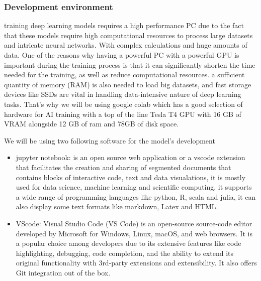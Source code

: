 \subsubsection{Development environment}
training deep learning models requires a high performance PC due to the fact that these models require high computational resources to process large datasets and intricate neural networks.  With complex calculations and huge amounts of data. One of the reasons why having a powerful PC with a powerful GPU is important during the training process is that it can significantly shorten the time needed for the training, as well as reduce computational resources. a sufficient quantity of memory (RAM) is also needed to load big datasets, and fast storage devices like SSDs are vital in handling data-intensive nature of deep learning tasks. That's why we will be using google colab which has a good selection of hardware for AI training with a top of the line Tesla T4 GPU with 16 GB of VRAM alongside 12 GB of ram and 78GB of disk space.


We will be using two following software for the model's development
\begin{itemize}
	\item jupyter notebook: is an open source web application or a vscode extension that facilitates the creation and sharing of segmented documents that contains blocks of interactive code, text and data visualations, it is mostly used for data science, machine learning and scientific computing, it supports a wide range of programming languages like python, R, scala and julia, it can also display some text formats like markdown, Latex and HTML.
	\item VScode: Visual Studio Code (VS Code) is an open-source source-code editor developed by Microsoft for Windows, Linux, macOS, and web browsers. It is a popular choice among developers due to its extensive features like code highlighting, debugging, code completion, and the ability to extend its original functionality with 3rd-party extensions and extensibility. It also offers Git integration out of the box.
\end{itemize}





